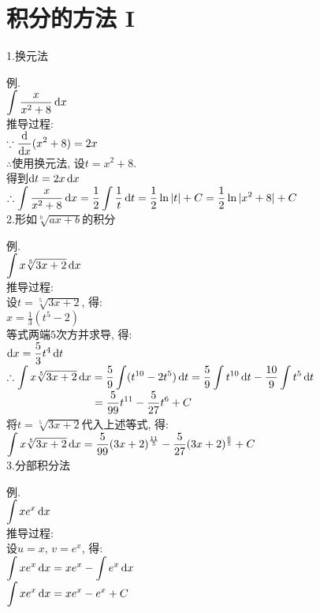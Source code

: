 \chapter{积分的方法 I}
1.换元法
{\par\centering
{}
\par}
例.\\[1ex]
$\displaystyle\int\frac{x}{x^2+8}\mathop{}\!\mathrm{d} x$\\[1ex]
推导过程:\\[1ex]
$\displaystyle\because\frac{\mathop{}\!\mathrm{d}}{\mathop{}\!\mathrm{d} x}(x^2+8)=2x$\\[1ex]
$\therefore$使用换元法, 设$t=x^2+8$.\\[1ex]
\phantom{$\therefore$}得到$\mathop{}\!\mathrm{d} t=2x\mathop{}\!\mathrm{d} x$\\[1ex]
$\therefore\displaystyle\int\frac{x}{x^2+8}\mathop{}\!\mathrm{d} x=\frac{1}{2}\int\frac{1}{t}\mathop{}\!\mathrm{d} t=\frac{1}{2}\ln|t|+C=\frac{1}{2}\ln|x^2+8|+C$\\[2ex]

2.形如$\sqrt[b]{ax+b}$的积分
{\par\centering
{}
\par}
例.\\[1ex]
$\displaystyle\int x\sqrt[5]{3x+2}\mathop{}\!\mathrm{d} x$\\[1ex]
推导过程:\\[1ex]
设$t=\sqrt[5]{3x+2}$, 得:\\[1ex]
$\displaystyle x=\frac{1}{3}(t^5-2)$\\[1ex]
等式两端$5$次方并求导, 得:\\[1ex]
$\displaystyle\mathop{}\!\mathrm{d} x=\frac{5}{3}t^4\mathop{}\!\mathrm{d} t$\\[1ex]
$\displaystyle\therefore\int x\sqrt[5]{3x+2}\mathop{}\!\mathrm{d} x=\frac{5}{9}\int(t^{10}-2t^5)\mathop{}\!\mathrm{d} t=\frac{5}{9}\int t^{10}\mathop{}\!\mathrm{d} t-\frac{10}{9}\int t^5\mathop{}\!\mathrm{d} t$\\[1ex]
$\displaystyle\phantom{\therefore\int x\sqrt[5]{3x+2}\dif x}=\frac{5}{99}t^{11}-\frac{5}{27}t^6+C$\\[1ex]
将$t=\sqrt[5]{3x+2}$代入上述等式, 得:\\[1ex]
$\displaystyle\int x\sqrt[5]{3x+2}\mathop{}\!\mathrm{d} x=\frac{5}{99}(3x+2)^{\frac{11}{5}}-\frac{5}{27}(3x+2)^{\frac{6}{5}}+C$\\[2ex]

3.分部积分法
{\par\centering
{}
\par}
例.\\[1ex]
$\displaystyle\int xe^x\mathop{}\!\mathrm{d} x$\\[1ex]
推导过程:\\[1ex]
设$u=x$, $v=e^x$, 得:\\[1ex]
$\displaystyle\int xe^x\mathop{}\!\mathrm{d} x=xe^x-\int e^x\mathop{}\!\mathrm{d} x$\\[1ex]
$\displaystyle\int xe^x\mathop{}\!\mathrm{d} x=xe^x-e^x+C$\\[2ex]


